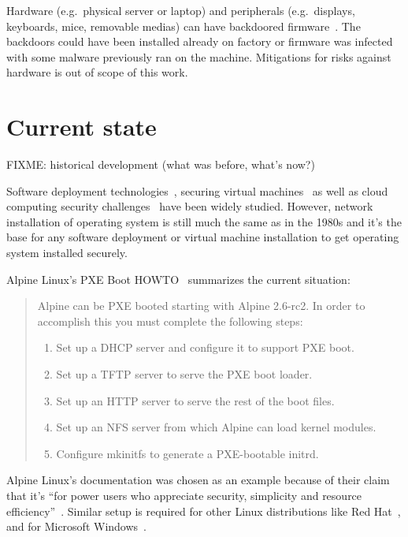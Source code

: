 Hardware (e.g.\ physical server or laptop) and peripherals (e.g.\
displays, keyboards, mice, removable medias) can have backdoored
firmware~\cite{swierczynski2016interdiction}. The backdoors could have
been installed already on factory or firmware was infected with some
malware previously ran on the machine. Mitigations for risks against
hardware is out of scope of this work.


\section{Current state}

FIXME: historical development (what was before, what's now?)

Software deployment technologies~\cite{SoftDep}, securing virtual
machines~\cite{Garfinkel2005} as well as cloud computing security
challenges~\cite{Owens2010}\cite{Hashizume2013} have been widely
studied. However, network installation of operating system is still
much the same as in the 1980s and it's the base for any software
deployment or virtual machine installation to get operating system
installed securely.

Alpine Linux's PXE Boot HOWTO~\cite{alpine-pxe-boot-howto} summarizes
the current situation:

\begin{quote}
Alpine can be PXE booted starting with Alpine 2.6-rc2. In order to
accomplish this you must complete the following steps:

\begin{enumerate}
\item Set up a DHCP server and configure it to support PXE boot.
\item Set up a TFTP server to serve the PXE boot loader.
\item Set up an HTTP server to serve the rest of the boot files.
\item Set up an NFS server from which Alpine can load kernel modules.
\item Configure mkinitfs to generate a PXE-bootable initrd.
\end{enumerate}
\end{quote}

Alpine Linux's documentation was chosen as an example because of their
claim that it's ``for power users who appreciate security, simplicity
and resource efficiency''~\cite{alpine-about}. Similar setup is
required for other Linux distributions like Red
Hat~\cite{redhat-network-install}, and for Microsoft
Windows~\cite{windows-network-install}.

